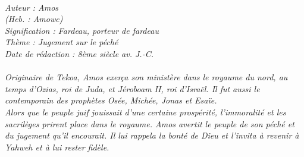 \BFont
\noindent\hrulefill
{\footnotesize
\textit{
\bigskip
{\centering{}
\\Auteur : Amos
\\(Heb. : Amowc)
\\Signification : Fardeau, porteur de fardeau
\\Thème : Jugement sur le péché
\\Date de rédaction : 8ème siècle av. J.-C.\\}
}
\textit{
\\Originaire de Tekoa, Amos exerça son ministère dans le royaume du nord, au temps d’Ozias,  roi de Juda, et Jéroboam II, roi d’Israël. Il fut aussi le contemporain des prophètes Osée, Michée, Jonas et Esaïe.
\\Alors que le peuple juif jouissait d’une certaine prospérité, l’immoralité et les sacrilèges prirent place dans le royaume. Amos avertit le peuple de son péché et du jugement qu'il encourait. Il lui rappela la bonté de Dieu et l’invita à revenir à Yahweh et à lui rester fidèle.\bigskip
}
}
\par\nobreak\noindent\hrulefill
